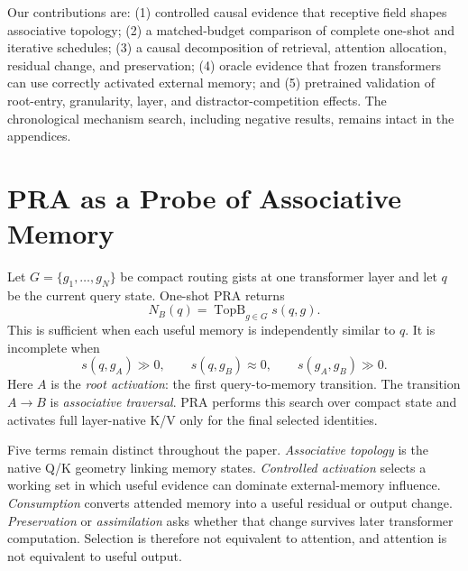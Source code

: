 Our contributions are: (1) controlled causal evidence that receptive field shapes associative
topology; (2) a matched-budget comparison of complete one-shot and iterative schedules; (3) a causal
decomposition of retrieval, attention allocation, residual change, and preservation; (4) oracle
evidence that frozen transformers can use correctly activated external memory; and (5) pretrained
validation of root-entry, granularity, layer, and distractor-competition effects.  The chronological
mechanism search, including negative results, remains intact in the appendices.

\section{PRA as a Probe of Associative Memory}

Let $G=\{g_1,\ldots,g_N\}$ be compact routing gists at one transformer layer and let $q$ be the
current query state.  One-shot PRA returns
\begin{equation}
  N_B(q)=\operatorname{TopB}_{g\in G}s(q,g).
\end{equation}
This is sufficient when each useful memory is independently similar to $q$.  It is incomplete when
\begin{equation}
  s(q,g_A)\gg0,\qquad s(q,g_B)\approx0,\qquad s(g_A,g_B)\gg0.
\end{equation}
Here $A$ is the \emph{root activation}: the first query-to-memory transition.  The transition
$A\rightarrow B$ is \emph{associative traversal}.  PRA performs this search over compact state and
activates full layer-native K/V only for the final selected identities.

Five terms remain distinct throughout the paper.  \emph{Associative topology} is the native Q/K
geometry linking memory states.  \emph{Controlled activation} selects a working set in which useful
evidence can dominate external-memory influence.  \emph{Consumption} converts attended memory into
a useful residual or output change.  \emph{Preservation} or \emph{assimilation} asks whether that
change survives later transformer computation.  Selection is therefore not equivalent to attention,
and attention is not equivalent to useful output.

